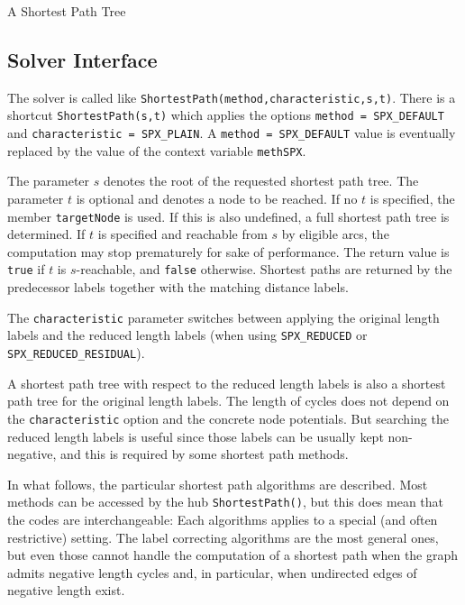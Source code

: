 \documentclass[a4paper,11pt,twoside]{book}
\begin{document}
\begin{multicols}{2}
\bigskip
\begin{figurehere}
\begin{center}
\epsfxsize=11cm
\vspace{0.5cm}
\caption{\label{flb_gsearch}A Shortest Path Tree}
\end{center}
\end{figurehere}


\subsection{Solver Interface}
The solver is called like \verb/ShortestPath(method,characteristic,s,t)/.
There is a shortcut \verb/ShortestPath(s,t)/ which applies the options \verb/method = SPX_DEFAULT/
and \verb/characteristic = SPX_PLAIN/. A \verb/method = SPX_DEFAULT/ value
is eventually replaced by the value of the context variable \verb/methSPX/.

The parameter $s$ denotes the root of the requested shortest path tree.
The parameter $t$ is optional and denotes a node to be reached. If no $t$ is
specified, the member \verb/targetNode/ is used. If this is also undefined,
a full shortest path tree is determined. If $t$ is specified and reachable from $s$
by eligible arcs, the computation may stop prematurely for sake of performance.
The return value is \verb/true/ if $t$ is $s$-reachable, and \verb/false/ otherwise.
Shortest paths are returned by the predecessor labels together with the matching
distance labels.

The \verb/characteristic/ parameter switches between applying the original length
labels and the reduced length labels (when using \verb/SPX_REDUCED/ or
\verb/SPX_REDUCED_RESIDUAL/).

A shortest path tree with respect to the reduced length labels is also a shortest
path tree for the original length labels. The length of cycles does not depend
on the \verb/characteristic/ option and the concrete node potentials. But
searching the reduced length labels is useful since those labels can be usually
kept non-negative, and this is required by some shortest path methods.

In what follows, the particular shortest path algorithms are described.
Most methods can be accessed by the hub \verb/ShortestPath()/, but this does mean
that the codes are interchangeable: Each algorithms applies to a special
(and often restrictive) setting. The label correcting algorithms are the most
general ones, but even those cannot handle the computation of a shortest path
when the graph admits negative length cycles and, in particular, when undirected
edges of negative length exist.


\end{multicols}
\end{document}
